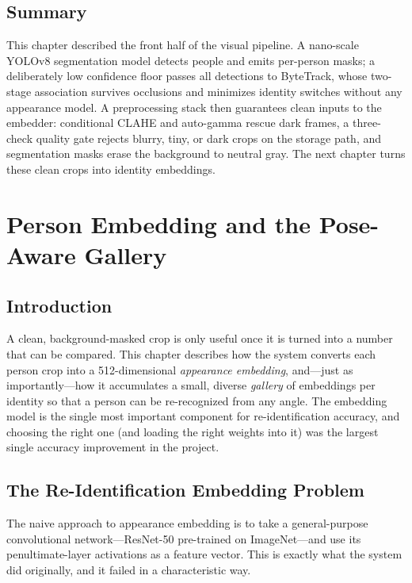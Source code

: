 \documentclass[12pt]{report}
\begin{document}
\section{Summary}
This chapter described the front half of the visual pipeline. A nano-scale YOLOv8 segmentation model detects people and emits per-person masks; a deliberately low confidence floor passes all detections to ByteTrack, whose two-stage association survives occlusions and minimizes identity switches without any appearance model. A preprocessing stack then guarantees clean inputs to the embedder: conditional CLAHE and auto-gamma rescue dark frames, a three-check quality gate rejects blurry, tiny, or dark crops on the storage path, and segmentation masks erase the background to neutral gray. The next chapter turns these clean crops into identity embeddings.

\newpage

\chapter{Person Embedding and the Pose-Aware Gallery}
\setcounter{section}{0}

\section{Introduction}
A clean, background-masked crop is only useful once it is turned into a number that can be compared. This chapter describes how the system converts each person crop into a 512-dimensional \emph{appearance embedding}, and---just as importantly---how it accumulates a small, diverse \emph{gallery} of embeddings per identity so that a person can be re-recognized from any angle. The embedding model is the single most important component for re-identification accuracy, and choosing the right one (and loading the right weights into it) was the largest single accuracy improvement in the project.

\section{The Re-Identification Embedding Problem}
The naive approach to appearance embedding is to take a general-purpose convolutional network---ResNet-50 pre-trained on ImageNet---and use its penultimate-layer activations as a feature vector. This is exactly what the system did originally, and it failed in a characteristic way.
\end{document}
